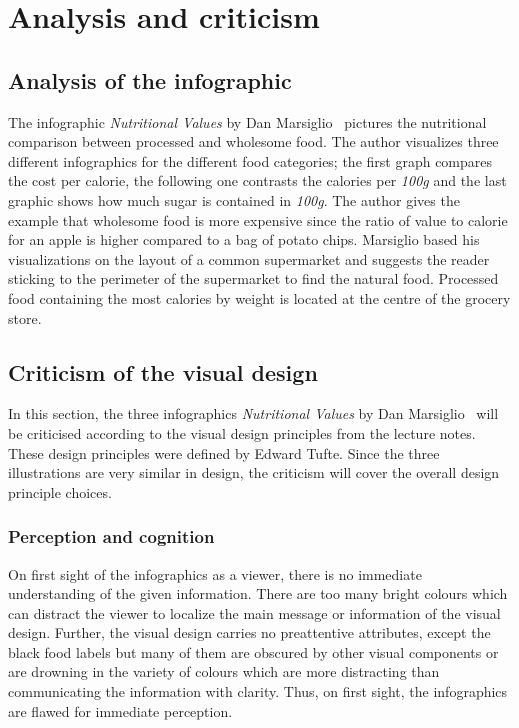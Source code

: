 \section{Analysis and criticism}

\subsection{Analysis of the infographic}

The infographic \textit{Nutritional Values} by Dan
Marsiglio~\cite{DanMarsiglio2008} pictures the nutritional comparison between
processed and wholesome food. The author visualizes three different infographics
for the different food categories; the first graph compares the cost per
calorie, the following one contrasts the calories per \textit{100g} and the last
graphic shows how much sugar is contained in \textit{100g}. The author gives the
example that wholesome food is more expensive since the ratio of value to
calorie for an apple is higher compared to a bag of potato chips. Marsiglio
based his visualizations on the layout of a common supermarket and suggests the
reader sticking to the perimeter of the supermarket to find the natural food.
Processed food containing the most calories by weight is located at the centre
of the grocery store.

\subsection{Criticism of the visual design}

In this section, the three infographics \textit{Nutritional Values} by Dan
Marsiglio~\cite{DanMarsiglio2008} will be criticised according to the visual
design principles from the lecture notes. These design principles were defined
by Edward Tufte\cite{Tufte2001}. Since the three illustrations are very similar
in design, the criticism will cover the overall design principle choices.

\subsubsection{Perception and cognition}

On first sight of the infographics as a viewer, there is no immediate
understanding of the given information. There are too many bright colours which
can distract the viewer to localize the main message or information of the
visual design. Further, the visual design carries no preattentive attributes,
except the black food labels but many of them are obscured by other visual
components or are drowning in the variety of colours which are more distracting
than communicating the information with clarity. Thus, on first sight, the
infographics are flawed for immediate perception.

